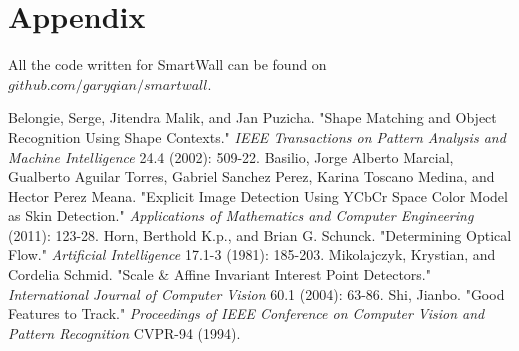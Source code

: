 \documentclass[twoside,twocolumn]{article}
\begin{document}
\section{Appendix}
All the code written for SmartWall can be found on $github.com/garyqian/smartwall$.

\begin{thebibliography}{99} %

 Belongie, Serge, Jitendra Malik, and Jan Puzicha. "Shape Matching and Object Recognition Using Shape Contexts." \textit{IEEE Transactions on Pattern Analysis and Machine Intelligence} 24.4 (2002): 509-22.
\newblock {}Basilio, Jorge Alberto Marcial, Gualberto Aguilar Torres, Gabriel Sanchez Perez, Karina Toscano Medina, and Hector Perez Meana. "Explicit Image Detection Using YCbCr Space Color Model as Skin Detection." \textit{Applications of Mathematics and Computer Engineering} (2011): 123-28.
\newblock {} Horn, Berthold K.p., and Brian G. Schunck. "Determining Optical Flow." \textit{Artificial Intelligence} 17.1-3 (1981): 185-203.
\newblock {} Mikolajczyk, Krystian, and Cordelia Schmid. "Scale \& Affine Invariant Interest Point Detectors." \textit{International Journal of Computer Vision} 60.1 (2004): 63-86. 
\newblock {} Shi, Jianbo. "Good 
Features to Track." \textit{Proceedings of IEEE Conference on Computer Vision and Pattern Recognition} CVPR-94 (1994).

\end{thebibliography}

\end{document}
